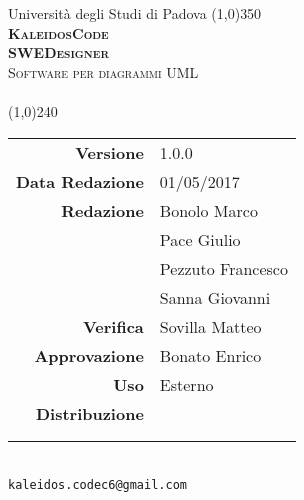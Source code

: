 \documentclass[a4paper,12pt]{article}
\author{KaleidosCode}
\date{09/03/2017}	%
\begin{document}
	\begin{titlepage}
		\centering Università degli Studi di Padova
		\line(1,0){350}\\
		\vspace{0.4cm}
		{\bfseries\scshape\LARGE KaleidosCode\\}
		\vspace{0.4cm}
		{\bfseries\scshape\LARGE SWEDesigner\\}
		{\scshape\Large Software per diagrammi UML\\}
		\vspace{1cm}
		{\scshape\Large \specificatecnicai\ \\}		%
		\vspace{1.4cm}
		\logo
		\vspace{1.2cm}
		\line(1,0){240}\\
		\begin{tabular}{r|l}
			{\hfill \textbf{Versione}} 			& 1.0.0\\
			{\hfill \textbf{Data Redazione}} 	& 01/05/2017\\	%
			{\hfill \textbf{Redazione}} 		& Bonolo Marco\\ & Pace Giulio\\ & Pezzuto Francesco\\ & Sanna Giovanni\\
			{\hfill \textbf{Verifica}} 			& Sovilla Matteo\\
			{\hfill \textbf{Approvazione}} 		& Bonato Enrico\\
			{\hfill \textbf{Uso}} 				& Esterno\\
			{\hfill \textbf{Distribuzione}} 	& \vardanega \\ & \cardin \\ & \proponente\\
		\end{tabular}\\
		\vspace{2cm}
		\texttt{kaleidos.codec6@gmail.com}
	\end{titlepage}

	\pagestyle{myfront}
	\newpage
		
	\newpage
		\tableofcontents
	\newpage
		\listoftables
	\newpage
		\listoffigures
	\newpage
	\pagestyle{mymain}
		
	\newpage
		
	\newpage
		
	\appendix
	\newpage
		
	\label{LastPage}
\end{document}
